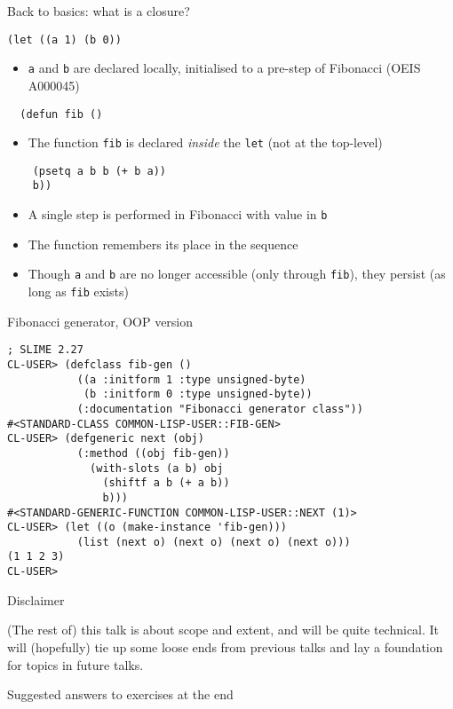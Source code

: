 \documentclass[presentation]{beamer}
\begin{document}
\begin{frame}[fragile]{Back to basics: what is a closure?}
\begin{verbatim}
(let ((a 1) (b 0))
\end{verbatim}
\begin{itemize}
\item \texttt{a} and \texttt{b} are declared locally, initialised to a pre-step of Fibonacci (OEIS A000045)
\end{itemize}
\begin{verbatim}
  (defun fib ()
\end{verbatim}
\begin{itemize}
\item The function \texttt{fib} is declared \emph{inside} the \texttt{let} (not at the top-level)
\end{itemize}
\begin{verbatim}
    (psetq a b b (+ b a))
    b))
\end{verbatim}
\begin{itemize}
\item A single step is performed in Fibonacci with value in \texttt{b}
\item The function remembers its place in the sequence
\item Though \texttt{a} and \texttt{b} are no longer accessible (only through \texttt{fib}), they persist (as long as \texttt{fib} exists)
\end{itemize}
\end{frame}

\begin{frame}[fragile]{Fibonacci generator, OOP version}
\begin{verbatim}
; SLIME 2.27
CL-USER> (defclass fib-gen ()
           ((a :initform 1 :type unsigned-byte)
            (b :initform 0 :type unsigned-byte))
           (:documentation "Fibonacci generator class"))
#<STANDARD-CLASS COMMON-LISP-USER::FIB-GEN>
CL-USER> (defgeneric next (obj)
           (:method ((obj fib-gen))
             (with-slots (a b) obj
               (shiftf a b (+ a b))
               b)))
#<STANDARD-GENERIC-FUNCTION COMMON-LISP-USER::NEXT (1)>
CL-USER> (let ((o (make-instance 'fib-gen)))
           (list (next o) (next o) (next o) (next o)))
(1 1 2 3)
CL-USER>
\end{verbatim}
\end{frame}
\begin{frame}{Disclaimer}

  (The rest of) this talk is about scope and extent, and will be quite technical.  It will (hopefully) tie up some loose ends from previous talks and lay a foundation for topics in future talks.

  \medskip
  Suggested answers to exercises at the end
\end{frame}
  
\end{document}
